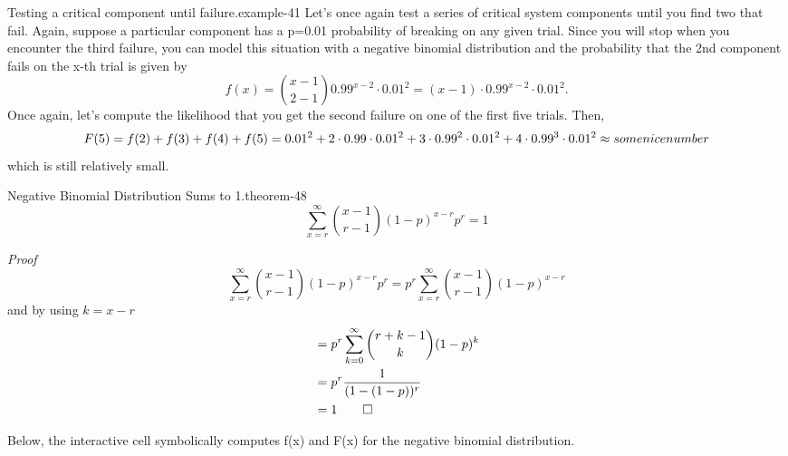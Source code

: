 \documentclass[10pt,]{book}
\makeatletter
\renewcommand*{\proofname}{Proof}
\renewenvironment{proof}[1][\proofname]{\par
  \pushQED{\qed}%
  \normalfont \topsep6\p@\@plus6\p@\relax
  \trivlist
  \item\relax
    {\itshape
    #1\@addpunct{.}}\hspace\labelsep\ignorespaces
}{%
  \popQED\endtrivlist\@endpefalse
}
\numberwithin{equation}{section}
\makeatother
\begin{document}
\begin{example}{Testing a critical component until failure.}{example-41}%
\hypertarget{p-969}{}%
Let's once again test a series of critical system components until you find two that fail. Again, suppose a particular component has a p=0.01 probability of breaking on any given trial. Since you will stop when you encounter the third failure, you can model this situation with a negative binomial distribution and the probability that the 2nd component fails on the x-th trial is given by%
\begin{equation*}
f(x) = \binom{x-1}{2-1} 0.99^{x-2} \cdot 0.01^2 = (x-1) \cdot 0.99^{x-2} \cdot 0.01^2.
\end{equation*}
Once again, let's compute the likelihood that you get the second failure on one of the first five trials. Then,%
\begin{equation*}
F(5) = f(2)+f(3)+f(4)+f(5) \\ = 0.01^2 + 2 \cdot 0.99 \cdot 0.01^2 + 3 \cdot 0.99^2 \cdot 0.01^2 + 4 \cdot 0.99^3 \cdot 0.01^2 \approx some nice number
\end{equation*}
which is still relatively small.%
\end{example}
\hypertarget{p-970}{}%
\begin{theorem}{Negative Binomial Distribution Sums to 1.}{}{theorem-48}%
\hypertarget{p-971}{}%
%
\begin{equation*}
\sum_{x=r}^{\infty} {\binom{x - 1}{r-1}(1-p)^{x-r}p^r} = 1
\end{equation*}
%
\end{theorem}
\begin{proof}\hypertarget{proof-50}{}
\hypertarget{p-972}{}%
%
\begin{equation*}
\sum_{x=r}^{\infty} {\binom{x - 1}{r-1}(1-p)^{x-r}p^r} = p^r \sum_{x=r}^{\infty} {\binom{x - 1}{r-1}(1-p)^{x-r}}
\end{equation*}
\hypertarget{p-973}{}%
and by using \(k = x-r\)%
%
\begin{align*}
& = p^r \sum_{k=0}^{\infty} {\binom{r + k - 1}{k}(1-p)^k}\\
& = p^r \frac{1}{(1-(1-p))^r}\\
& = 1\qedhere
\end{align*}
%
\end{proof}
%
\par
\hypertarget{p-974}{}%
Below, the interactive cell symbolically computes f(x) and F(x) for the negative binomial distribution.%
\par
\hypertarget{p-975}{}%
\leavevmode%
\end{document}

